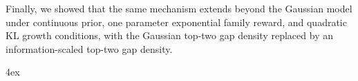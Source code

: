 \documentclass[10pt]{article}
\theoremstyle{plain}
\begin{document}
Finally, we showed that the same mechanism extends beyond the Gaussian model
under continuous prior, one parameter exponential family reward, and quadratic KL growth conditions, with the Gaussian top-two gap density replaced by an information-scaled top-two gap density. 























\begingroup \parindent 0pt \parskip 4ex
\def\enotesize{\normalsize} 
\endgroup

%
%
%


















































\end{document}
